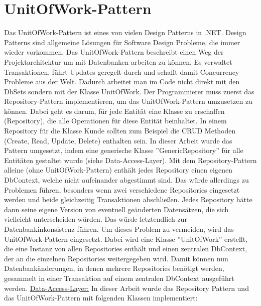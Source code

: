 \section{UnitOfWork-Pattern}
Das UnitOfWork-Pattern ist eines von vielen Design Patterns in .NET. Design Patterns sind allgemeine Lösungen für Software Design Probleme, die immer wieder vorkommen. Das UnitOfWork-Pattern beschreibt einen Weg der Projektarchitektur um mit Datenbanken arbeiten zu können. Es verwaltet Transaktionen, führt Updates geregelt durch und schafft damit Concurrency-Probleme aus der Welt. Dadurch arbeitet man im Code nicht direkt mit den DbSets sondern mit der Klasse UnitOfWork. \newline Der Programmierer muss zuerst das Repository-Pattern implementieren, um das UnitOf\-Work-Pattern umzusetzen zu können. Dabei geht es darum, für jede Entität eine Klasse zu erschaffen (Repository), die alle Operationen für diese Entität beinhaltet. In einem Repository für die Klasse Kunde sollten zum Beispiel die CRUD Methoden (Create, Read, Update, Delete) enthalten sein. In dieser Arbeit wurde das Pattern umgesetzt, indem eine generische Klasse ''GenericRepository'' für alle Entitäten gestaltet wurde (siehe Data-Access-Layer). 
\newline Mit dem Repository-Pattern alleine (ohne UnitOfWork-Pattern) enthält jedes Repository einen eigenen DbContext, welche nicht aufeinander abgestimmt sind. Das würde allerdings zu Problemen führen, besonders wenn zwei verschiedene Repositories eingesetzt werden und beide gleichzeitig Transaktionen abschließen. Jedes Repository hätte dann seine eigene Version von eventuell geänderten Datensätzen, die sich vielleicht unterscheiden würden. Das würde letztendlich zur Datenbankinkonsistenz führen.
\newline Um dieses Problem zu vermeiden, wird das UnitOfWork-Pattern eingesetzt. Dabei wird eine Klasse ''UnitOfWork'' erstellt, die eine Instanz von allen Repositories enthält und einen zentralen DbContext, der an die einzelnen Repositories weitergegeben wird. Damit können nun Datenbankänderungen, in denen mehrere Repositories benötigt werden, gesammelt in 
einer Transaktion auf einem zentralen DbContext ausgeführt werden.
\newline
\newline
\underline{Data-Access-Layer:}
In dieser Arbeit wurde das Repository Pattern und das UnitOfWork-Pattern mit folgenden Klassen implementiert:
